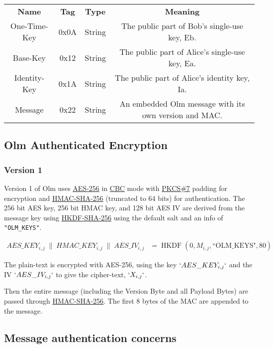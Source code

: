 \documentclass[10pt]{article}
\makeatletter
\newcommand\tmpset[2]{
  \begingroup
  #1
  #2
  \endgroup
}
\newcommand\autoscaletable[3][0pt]{
  \tmpset{\setlength\tabcolsep{#1}}{
    \noindent
    \begin{tabular*}{\textwidth}{@{\extracolsep{\fill}} #2}
      #3
    \end{tabular*}}
}
\makeatother
\begin{document}
\autoscaletable{c c c c}{
\textbf{Name} & \textbf{Tag} & \textbf{Type} & \textbf{Meaning} \\
One-Time-Key & 0x0A & String & The public part of Bob's single-use key,
Eb. \\
Base-Key & 0x12 & String & The public part of Alice's single-use key,
Ea. \\
Identity-Key & 0x1A & String & The public part of Alice's identity key,
Ia. \\
Message & 0x22 & String & An embedded Olm message with its own version
and MAC. \\
}

\subsection{Olm Authenticated
Encryption}\label{olm-authenticated-encryption}

\subsubsection{Version 1}\label{version-1}

Version 1 of Olm uses
\href{http://csrc.nist.gov/publications/fips/fips197/fips-197.pdf}{AES-256}
in
\href{http://csrc.nist.gov/publications/nistpubs/800-38a/sp800-38a.pdf}{CBC}
mode with \href{https://tools.ietf.org/html/rfc2315}{PKCS\#7} padding
for encryption and
\href{https://tools.ietf.org/html/rfc2104}{HMAC-SHA-256} (truncated to
64 bits) for authentication. The 256 bit AES key, 256 bit HMAC key, and
128 bit AES IV are derived from the message key using
\href{https://tools.ietf.org/html/rfc5869}{HKDF-SHA-256} using the
default salt and an info of \texttt{"OLM\_KEYS"}.

$\begin{aligned}
    AES\_KEY_{i,j}\;\parallel\;HMAC\_KEY_{i,j}\;\parallel\;AES\_IV_{i,j}
    &= \operatorname{HKDF}\left(0,M_{i,j},\text{``OLM\_KEYS"},80\right)
\end{aligned}$

The plain-text is encrypted with AES-256, using the key
\(`AES\_KEY_{i,j}`\) and the IV \(`AES\_IV_{i,j}`\) to give the
cipher-text, \(`X_{i,j}`\).

Then the entire message (including the Version Byte and all Payload
Bytes) are passed through
\href{https://tools.ietf.org/html/rfc2104}{HMAC-SHA-256}. The first 8
bytes of the MAC are appended to the message.

\subsection{Message authentication
concerns}\label{message-authentication-concerns}
\end{document}
